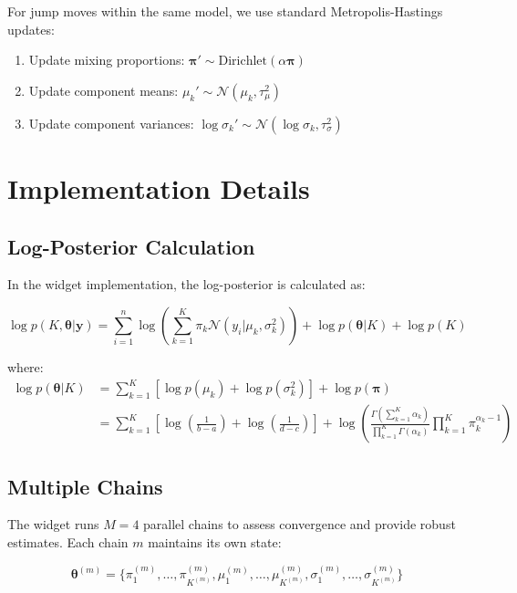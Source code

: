 \documentclass[12pt]{article}
\begin{document}
For jump moves within the same model, we use standard Metropolis-Hastings updates:

\begin{enumerate}
\item Update mixing proportions: $\boldsymbol{\pi}' \sim \text{Dirichlet}(\alpha \boldsymbol{\pi})$
\item Update component means: $\mu_k' \sim \mathcal{N}(\mu_k, \tau_{\mu}^2)$
\item Update component variances: $\log \sigma_k' \sim \mathcal{N}(\log \sigma_k, \tau_{\sigma}^2)$
\end{enumerate}

\section{Implementation Details}

\subsection{Log-Posterior Calculation}

In the widget implementation, the log-posterior is calculated as:

\begin{equation}
\log p(K, \boldsymbol{\theta}|\mathbf{y}) = \sum_{i=1}^n \log\left(\sum_{k=1}^K \pi_k \mathcal{N}(y_i|\mu_k, \sigma_k^2)\right) + \log p(\boldsymbol{\theta}|K) + \log p(K)
\end{equation}

where:
\begin{align}
\log p(\boldsymbol{\theta}|K) &= \sum_{k=1}^K \left[\log p(\mu_k) + \log p(\sigma_k^2)\right] + \log p(\boldsymbol{\pi}) \\
&= \sum_{k=1}^K \left[\log\left(\frac{1}{b-a}\right) + \log\left(\frac{1}{d-c}\right)\right] + \log\left(\frac{\Gamma(\sum_{k=1}^K \alpha_k)}{\prod_{k=1}^K \Gamma(\alpha_k)} \prod_{k=1}^K \pi_k^{\alpha_k-1}\right)
\end{align}

\subsection{Multiple Chains}

The widget runs $M = 4$ parallel chains to assess convergence and provide robust estimates. Each chain $m$ maintains its own state:

\begin{equation}
\boldsymbol{\theta}^{(m)} = \{\pi_1^{(m)}, \ldots, \pi_{K^{(m)}}^{(m)}, \mu_1^{(m)}, \ldots, \mu_{K^{(m)}}^{(m)}, \sigma_1^{(m)}, \ldots, \sigma_{K^{(m)}}^{(m)}\}
\end{equation}
\end{document}
